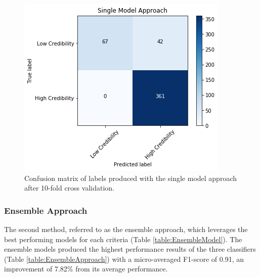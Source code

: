\documentclass[a4paper,twoside,phd]{BYUPhys}
\begin{document}
\begin{figure}[H]
	\centering
	\includegraphics[totalheight=7cm]{images/single-model-performance.png}
	\caption{Confusion matrix of labels produced with the single model approach after 10-fold cross validation.}
	\label{fig:SingleModelPerformance}
\end{figure}

\subsubsection{Ensemble Approach}
The second method, referred to as the ensemble approach, which leverages the best performing models for each criteria (Table \ref{table:EnsembleModel}). The ensemble models produced the highest performance results of the three classifiers (Table \ref{table:EnsembleApproach}) with a micro-averaged F1-score of 0.91, an improvement of 7.82\% from its average performance.
\end{document}
